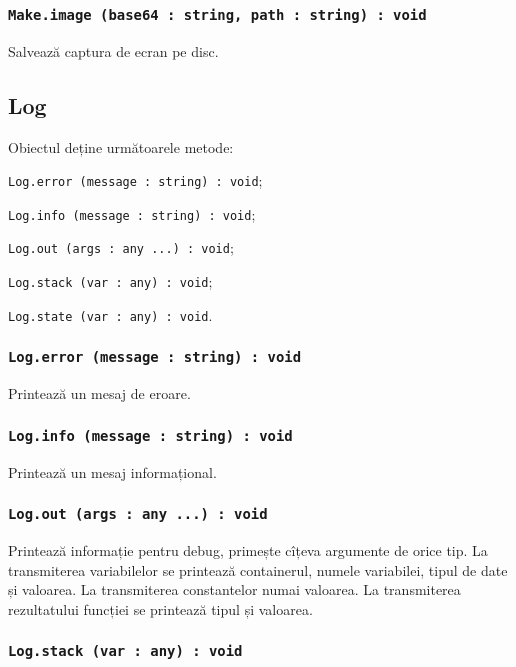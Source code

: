 \subsubsection{\texttt{Make.image (base64 : string, path : string) : void}}

Salvează captura de ecran pe disc.

\subsection{{\color{orange} Log}}

Obiectul \logtype{} deține următoarele metode:
\begin{icItems}
	\item \texttt{Log.error (message : string) : void};
	\item \texttt{Log.info (message : string) : void};
	\item \texttt{Log.out (args : any ...) : void};
	\item \texttt{Log.stack (var : any) : void};
	\item \texttt{Log.state (var : any) : void}.
\end{icItems}

\subsubsection{\texttt{Log.error (message : string) : void}}

Printează un mesaj de eroare.

\subsubsection{\texttt{Log.info (message : string) : void}}

Printează un mesaj informațional.

\subsubsection{\texttt{Log.out (args : any ...) : void}}

Printează informație pentru debug, primește cîțeva argumente de orice tip. La transmiterea variabilelor se printează containerul, numele variabilei, tipul de date și valoarea. La transmiterea constantelor numai valoarea. La transmiterea rezultatului funcției se printează tipul și valoarea.

\subsubsection{\texttt{Log.stack (var : any) : void}}

